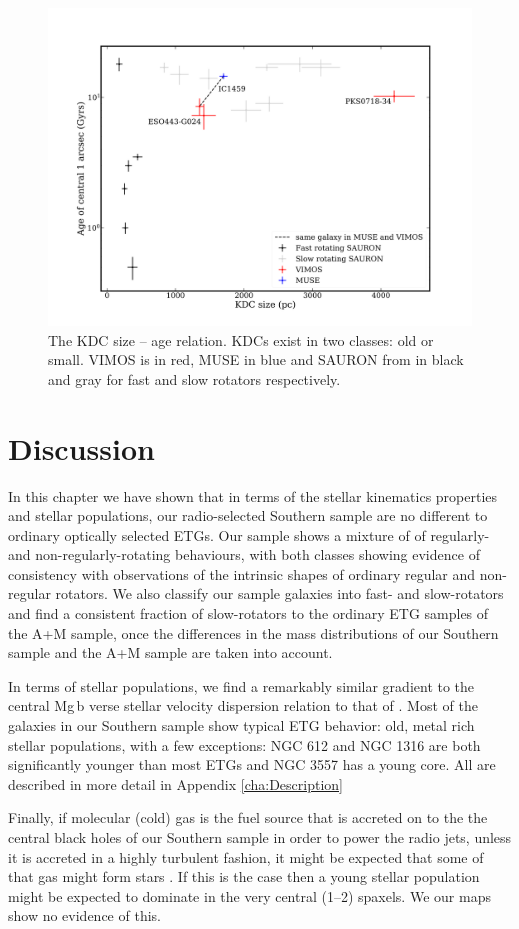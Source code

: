 		\begin{figure}
			\centering
			\includegraphics[width=.7\textwidth]{chapter4/KDC_size_age.png}
			\caption[KDC dichotomy]{The KDC size -- age relation. KDCs exist in two classes: old or small. VIMOS is in red, MUSE in blue and SAURON from \citet{Kuntschner2010} in black and gray for fast and slow rotators respectively.}
			\label{fig:KDC}
		\end{figure}
	
\section{Discussion}
	\label{sec:stellarDiscussion}
	In this chapter we have shown that in terms of the stellar kinematics properties and stellar populations, our radio-selected Southern sample are no different to ordinary optically selected ETGs. Our sample shows a mixture of of regularly- and non-regularly-rotating behaviours, with both classes showing evidence of consistency with observations of the intrinsic shapes of ordinary regular and non-regular rotators. We also classify our sample galaxies into fast- and slow-rotators and find a consistent fraction of slow-rotators to the ordinary ETG samples of the A+M sample, once the differences in the mass distributions of our Southern sample and the A+M sample are taken into account. 

	In terms of stellar populations, we find a remarkably similar gradient to the central Mg\,b verse stellar velocity dispersion relation to that of \citet{Ziegler1997}. Most of the galaxies in our Southern sample show typical ETG behavior: old, metal rich stellar populations, with a few exceptions: NGC 612 and NGC 1316 are both significantly younger than most ETGs and NGC 3557 has a young core. All are described in more detail in Appendix \ref{cha:Description} 

	Finally, if molecular (cold) gas is the fuel source that is accreted on to the the central black holes of our Southern sample in order to power the radio jets, unless it is accreted in a highly turbulent fashion, it might be expected that some of that gas might form stars \citep[e.g.][]{Collin1999, Diamond-Stanic2012, LaMassa2013}. If this is the case then a young stellar population might be expected to dominate in the very central (1--2) spaxels. We our maps show no evidence of this. 
